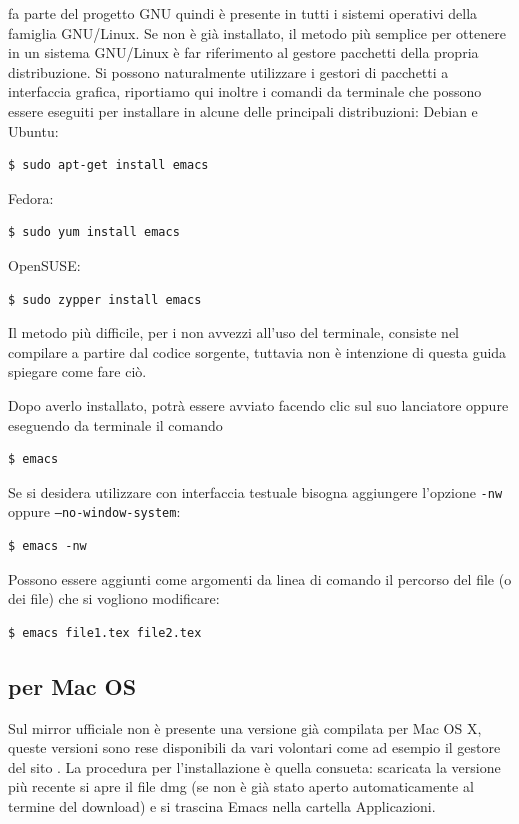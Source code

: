 \documentclass[11pt,a4paper]{article}
\begin{document}
\emacs{} fa parte del progetto GNU quindi è presente in tutti i
sistemi operativi della famiglia GNU/Linux. Se non è già installato,
il metodo più semplice per ottenere \emacs{} in un sistema GNU/Linux è
far riferimento al gestore pacchetti della propria distribuzione. Si
possono naturalmente utilizzare i gestori di pacchetti a interfaccia
grafica, riportiamo qui inoltre i comandi da terminale che possono
essere eseguiti per installare \emacs{} in alcune delle principali
distribuzioni: Debian e Ubuntu:
\begin{Verbatim}
$ sudo apt-get install emacs
\end{Verbatim}
Fedora:
\begin{Verbatim}
$ sudo yum install emacs
\end{Verbatim}
OpenSUSE:
\begin{Verbatim}
$ sudo zypper install emacs
\end{Verbatim}

Il metodo più difficile, per i non avvezzi all'uso del terminale,
consiste nel compilare \emacs{} a partire dal codice sorgente,
tuttavia non è intenzione di questa guida spiegare come fare ciò.

Dopo averlo installato, \emacs{} potrà essere avviato facendo clic sul
suo lanciatore oppure eseguendo da terminale il comando
\begin{Verbatim}
$ emacs
\end{Verbatim}
Se si desidera utilizzare \emacs{} con interfaccia testuale bisogna
aggiungere l'opzione \texttt{-nw} oppure \texttt{--no-window-system}:
\begin{Verbatim}
$ emacs -nw
\end{Verbatim}
Possono essere aggiunti come argomenti da linea di comando il percorso
del file (o dei file) che si vogliono modificare:
\begin{Verbatim}
$ emacs file1.tex file2.tex
\end{Verbatim}

\subsection{\emacs{} per Mac OS}

Sul mirror ufficiale %
 non
è presente una versione già compilata per Mac OS X, queste versioni
sono rese disponibili da vari volontari come ad esempio il gestore del
sito . La
procedura per l'installazione è quella consueta: scaricata la versione
più recente si apre il file dmg (se non è già stato aperto
automaticamente al termine del download) e si trascina Emacs nella
cartella Applicazioni.
\end{document}
